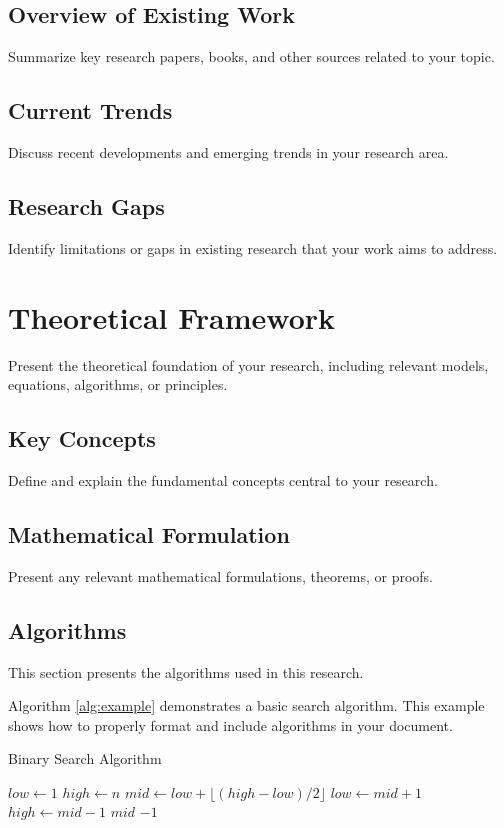 \section{Overview of Existing Work}
Summarize key research papers, books, and other sources related to your topic.

\section{Current Trends}
Discuss recent developments and emerging trends in your research area.

\section{Research Gaps}
Identify limitations or gaps in existing research that your work aims to address.

\chapter{Theoretical Framework}
Present the theoretical foundation of your research, including relevant models, equations, algorithms, or principles.

\section{Key Concepts}
Define and explain the fundamental concepts central to your research.

\section{Mathematical Formulation}
Present any relevant mathematical formulations, theorems, or proofs.

\section{Algorithms}
This section presents the algorithms used in this research.

Algorithm \ref{alg:example} demonstrates a basic search algorithm. This example shows how to properly format and include algorithms in your document.

\begin{algorithm}
    \caption{Binary Search Algorithm}
    \label{alg:example}
    \begin{algorithmic}[1]
        \State $low \gets 1$
        \State $high \gets n$
        \State $mid \gets low + \lfloor (high - low) / 2 \rfloor$ 
        \State $low \gets mid + 1$
        \State $high \gets mid - 1$
        \Else
        \State \Return $mid$
        \EndIf
        \EndWhile
        \State \Return $-1$
        \EndProcedure
    \end{algorithmic}
\end{algorithm}

